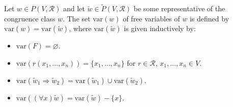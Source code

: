 Let $w \in P(V, \mathcal{R})$ and let $\tilde{w} \in \tilde{P}(V, \mathcal{R})$ be some representative of the congruence class $w$. The set $\text{var}(w)$ of free variables of $w$ is defined by $\text{var}(w) = \text{var}(\tilde{w})$, where $\text{var}(\tilde{w})$ is given inductively by:
\begin{itemize}
\item[(i)] $\text{var}(F) = \varnothing$.
\item[(ii)] $\text{var}(r(x_1, \ldots, x_n)) = \{x_1, \ldots, x_n\}$ for $r \in \mathcal{R}$, $x_1, \ldots, x_n \in V$.
\item[(iii)] $\text{var}(\tilde{w}_1 \Rightarrow \tilde{w}_2) = \text{var}(\tilde{w}_1) \cup \text{var}(\tilde{w}_2)$.
\item[(iv)] $\text{var}((\forall x)\tilde{w}) = \text{var}(\tilde{w}) - \{x\}$.
\end{itemize}

